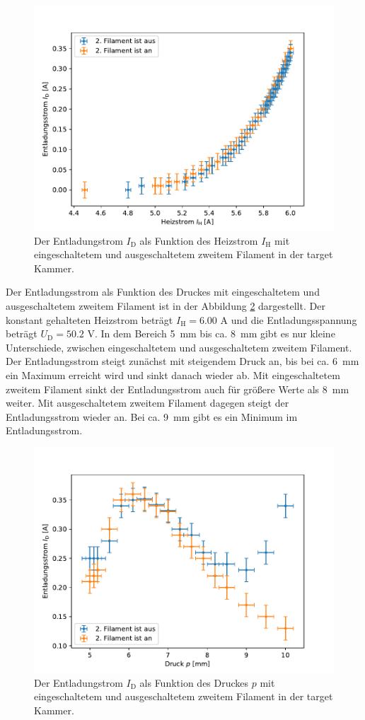 \begin{figure}[H]
\centering
\includegraphics[scale=0.6]{3_1_Strom.pdf}
\caption{Der Entladungstrom $I_{\mathrm{D}}$ als Funktion des Heizstrom $I_{\mathrm{H}}$  mit eingeschaltetem und ausgeschaltetem zweitem Filament in der target Kammer.}
\label{fig:3_1_Strom}
\end{figure}
Der Entladungsstrom als Funktion des Druckes mit eingeschaltetem und ausgeschaltetem zweitem Filament ist in der Abbildung \ref{fig:3_1_Druck} dargestellt. Der konstant gehalteten Heizstrom beträgt $ I_{\mathrm{H}} =6.00$ A und die Entladungsspannung beträgt $U_{\mathrm{D}}=50.2$ V. In dem Bereich \SI{5}{mm} bis ca. \SI{8}{mm} gibt es nur kleine Unterschiede, zwischen eingeschaltetem und ausgeschaltetem zweitem Filament. Der Entladungsstrom steigt zunächst mit steigendem Druck an, bis bei ca. \SI{6}{mm} ein Maximum erreicht wird und sinkt danach wieder ab. Mit eingeschaltetem zweitem Filament sinkt der Entladungsstrom auch für größere Werte als \SI{8}{mm} weiter. Mit ausgeschaltetem zweitem Filament dagegen steigt der Entladungsstrom wieder an. Bei ca. \SI{9}{mm} gibt es ein Minimum im Entladungsstrom. 
\begin{figure}[H]
\centering
\includegraphics[scale=0.6]{3_1_Druck.pdf}
\caption{Der Entladungstrom $I_{\mathrm{D}}$ als Funktion des Druckes $p$ mit eingeschaltetem und ausgeschaltetem zweitem Filament in der target Kammer.}
\label{fig:3_1_Druck}
\end{figure}
